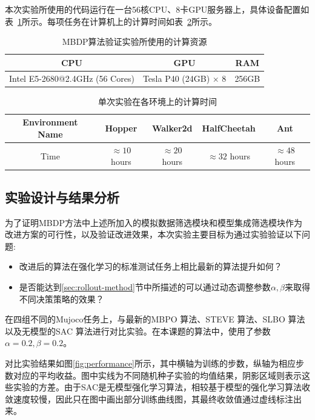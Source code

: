 本次实验所使用的代码运行在一台56核CPU、8卡GPU服务器上，具体设备配置如表~\ref{tab:computing-resources}所示。每项任务在计算机上的计算时间如表~\ref{tab:run-time}所示。

\begin{table}
\centering
\begin{tabular}{c|c|c}
\toprule[2pt]
CPU                      & GPU                         & RAM   \\
\midrule[1pt]
Intel E5-2680@2.4GHz (56 Cores) & Tesla P40 (24GB) $\times$ 8 & 256GB\\
\bottomrule[2pt]
\end{tabular}
\caption{MBDP算法验证实验所使用的计算资源}
\label{tab:computing-resources}
\end{table}

\begin{table}
\centering
\begin{tabular}{c|c|c|c|c}
\toprule[2pt]
Environment Name  & Hopper      & Walker2d    & HalfCheetah & Ant         \\
\midrule[1pt]
Time & $\approx 10$ hours & $\approx 20$ hours & $\approx 32$ hours & $\approx 48$ hours \\
\bottomrule[2pt]
\end{tabular}
\caption{单次实验在各环境上的计算时间}
\label{tab:run-time}
\end{table}

\subsection{实验设计与结果分析}

为了证明MBDP方法中上述所加入的模拟数据筛选模块和模型集成筛选模块作为改进方案的可行性，以及验证改进效果，本次实验主要目标为通过实验验证以下问题:

\begin{itemize}
    \item 改进后的算法在强化学习的标准测试任务上相比最新的算法提升如何？
    \item 是否能达到\ref{sec:rollout-method}节中所描述的可以通过动态调整参数$\alpha,\beta$来取得不同决策策略的效果？
\end{itemize}

在四组不同的Mujoco任务上，与最新的MBPO \cite{janner2019trust}算法、STEVE \cite{buckman2018sample}算法、SLBO \cite{Luo2019AlgorithmicGuarantees}算法以及无模型的SAC \cite{haarnoja2018soft}算法进行对比实验。在本课题的算法中，使用了参数$\alpha=0.2, \beta=0.2$。

对比实验结果如图\ref{fig:performance}所示，其中横轴为训练的步数，纵轴为相应步数对应的平均收益。图中实线为不同随机种子实验的均值结果，阴影区域则表示这些实验的方差。由于SAC是无模型强化学习算法，相较基于模型的强化学习算法收敛速度较慢，因此只在图中画出部分训练曲线图，其最终收敛值通过虚线标注出来。

